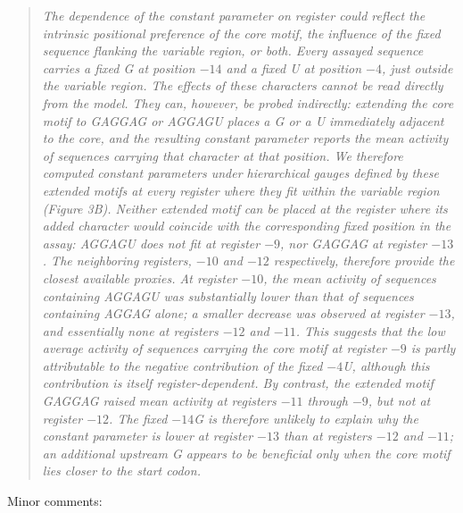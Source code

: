 \documentclass[11pt]{article}
\newenvironment{msquote}
  {\begin{quote}\color{responseblue}\itshape\noindent\ignorespaces}
  {\end{quote}}
\begin{document}
\begin{msquote}
The dependence of the constant parameter on register could reflect the intrinsic
positional preference of the core motif, the influence of the fixed sequence
flanking the variable region, or both. Every assayed sequence carries a fixed G
at position $-14$ and a fixed U at position $-4$, just outside the variable
region. The effects of these characters cannot be read directly from the model.
They can, however, be probed indirectly: extending the core motif to GAGGAG or
AGGAGU places a G or a U immediately adjacent to the core, and the resulting
constant parameter reports the mean activity of sequences carrying that character
at that position. We therefore computed constant parameters under hierarchical
gauges defined by these extended motifs at every register where they fit within
the variable region (Figure 3B). Neither extended motif can be placed at the
register where its added character would coincide with the corresponding fixed
position in the assay: AGGAGU does not fit at register $-9$, nor GAGGAG at
register $-13$. The neighboring registers, $-10$ and $-12$ respectively,
therefore provide the closest available proxies. At register $-10$, the mean
activity of sequences containing AGGAGU was substantially lower than that of
sequences containing AGGAG alone; a smaller decrease was observed at register
$-13$, and essentially none at registers $-12$ and $-11$. This suggests that the
low average activity of sequences carrying the core motif at register $-9$ is
partly attributable to the negative contribution of the fixed $-4$U, although
this contribution is itself register-dependent. By contrast, the extended motif
GAGGAG raised mean activity at registers $-11$ through $-9$, but not at register
$-12$. The fixed $-14$G is therefore unlikely to explain why the constant
parameter is lower at register $-13$ than at registers $-12$ and $-11$; an
additional upstream G appears to be beneficial only when the core motif lies
closer to the start codon.
\end{msquote}

\medskip
\noindent Minor comments:
\end{document}
